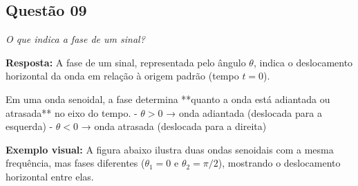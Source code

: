 \subsection*{Questão 09}

\textit{O que indica a fase de um sinal?}\par

\textbf{Resposta: } 
A fase de um sinal, representada pelo ângulo \(\theta\), indica o deslocamento horizontal da onda em relação à origem padrão (tempo \(t=0\)).

Em uma onda senoidal, a fase determina **quanto a onda está adiantada ou atrasada** no eixo do tempo.  
- \(\theta > 0\) → onda adiantada (deslocada para a esquerda)  
- \(\theta < 0\) → onda atrasada (deslocada para a direita)\par

\textbf{Exemplo visual: } 
A figura abaixo ilustra duas ondas senoidais com a mesma frequência, mas fases diferentes (\(\theta_1=0\) e \(\theta_2=\pi/2\)), mostrando o deslocamento horizontal entre elas.

\begin{center}
\end{center}